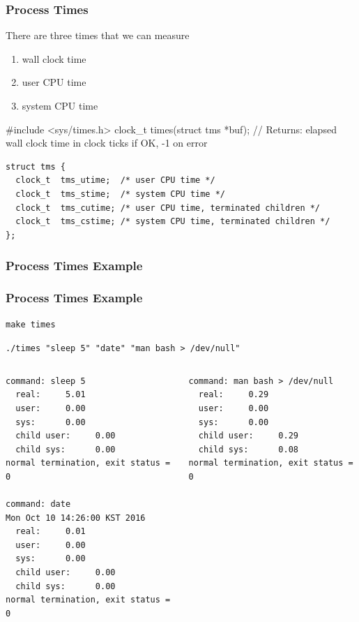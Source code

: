 \documentclass[newPxFont,sthlmFooter,nooffset]{beamer}
\begin{document}
\begin{frame}
  \frametitle{Process Times}

There are three times that we can measure
\begin{enumerate}
\item \footnotesize wall clock time
\item \footnotesize user CPU time
\item \footnotesize system CPU time
\end{enumerate}

\begin{codedef}
#include <sys/times.h>
clock\_t times(struct tms *buf);
// Returns: elapsed wall clock time in clock ticks if OK, -1 on error
\end{codedef}

\begin{verbatim}
struct tms {
  clock_t  tms_utime;  /* user CPU time */
  clock_t  tms_stime;  /* system CPU time */
  clock_t  tms_cutime; /* user CPU time, terminated children */
  clock_t  tms_cstime; /* system CPU time, terminated children */
};
\end{verbatim}


\end{frame}


\begin{frame}
  \frametitle{Process Times Example }


\end{frame}

\begin{frame}[fragile,t]
  \frametitle{Process Times Example}

\lstset{basicstyle=\footnotesize, numbers=none, lineskip=0pt}
\texttt{make times}

\texttt{./times "sleep 5" "date" "man bash > /dev/null"}
\vspace{-2em}
\begin{columns}[t]
  \begin{column}{0.45\linewidth}
\begin{lstlisting}
command: sleep 5
  real:     5.01
  user:     0.00
  sys:      0.00
  child user:     0.00
  child sys:      0.00
normal termination, exit status = 0

command: date
Mon Oct 10 14:26:00 KST 2016
  real:     0.01
  user:     0.00
  sys:      0.00
  child user:     0.00
  child sys:      0.00
normal termination, exit status = 0
\end{lstlisting}
  \end{column}
  \begin{column}{0.45\linewidth}
\begin{lstlisting}
command: man bash > /dev/null
  real:     0.29
  user:     0.00
  sys:      0.00
  child user:     0.29
  child sys:      0.08
normal termination, exit status = 0
\end{lstlisting}   
  \end{column}
\end{columns}

\end{frame}
\end{document}
